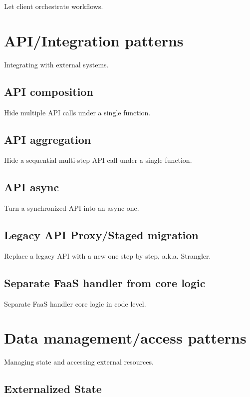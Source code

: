Let client orchestrate workflows.


\section{API/Integration patterns} \label{sec:apiPatterns}

Integrating with external systems.

\subsection{API composition} \label{subsubsec:apiComposition}

Hide multiple API calls under a single function.

\subsection{API aggregation} \label{subsubsec:apiAggregation}

Hide a sequential multi-step API call under a single function.

\subsection{API async} \label{subsubsec:apiAsync}

Turn a synchronized API into an async one.

\subsection{Legacy API Proxy/Staged migration} \label{subsubsec:legacyApi}

Replace a legacy API with a new one step by step, a.k.a. Strangler.

\subsection{Separate FaaS handler from core logic} \label
{subsubsec:separateHandler}

Separate FaaS handler core logic in code level.

\section{Data management/access patterns} \label{sec:dataManagementPatterns}

Managing state and accessing external resources.

\subsection{Externalized State} \label{subsubsec:externalizedState}

